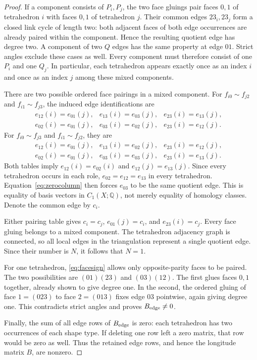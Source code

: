 \documentclass[11pt]{article}
\theoremstyle{definition}\newtheorem{definition}[theorem]{Definition}
\theoremstyle{remark}\newtheorem{remark}[theorem]{Remark}
\newcommand{\Q}{\mathbb Q}
\begin{document}
\begin{proof}
If a component consists of $P_i,P_j$, the two face gluings pair
faces $0,1$ of tetrahedron $i$ with faces $0,1$ of tetrahedron $j$.
Their common edges $23_i,23_j$ form a closed link cycle of length
two: both adjacent faces of both edge occurrences are already paired
within the component. Hence the resulting quotient edge has degree
two. A component of two $Q$ edges has the same property at edge
$01$. Strict angles exclude these cases as well. Every component
must therefore consist of one $P_i$ and one $Q_j$. In particular,
each tetrahedron appears exactly once as an index $i$ and once as
an index $j$ among these mixed components.

There are two possible ordered face pairings in a mixed component.
For $f_{i0}\sim f_{j2}$ and $f_{i1}\sim f_{j3}$, the induced edge
identifications are
\[
\begin{array}{lll}
e_{12}(i)=e_{01}(j),&e_{13}(i)=e_{03}(j),&e_{23}(i)=e_{13}(j),\\
e_{02}(i)=e_{01}(j),&e_{03}(i)=e_{02}(j),&e_{23}(i)=e_{12}(j).
\end{array}
\]
For $f_{i0}\sim f_{j3}$ and $f_{i1}\sim f_{j2}$, they are
\[
\begin{array}{lll}
e_{12}(i)=e_{01}(j),&e_{13}(i)=e_{02}(j),&e_{23}(i)=e_{12}(j),\\
e_{02}(i)=e_{01}(j),&e_{03}(i)=e_{03}(j),&e_{23}(i)=e_{13}(j).
\end{array}
\]
Both tables imply $e_{12}(i)=e_{02}(i)$ and
$e_{12}(j)=e_{13}(j)$. Since every tetrahedron occurs in each role,
$e_{02}=e_{12}=e_{13}$ in every tetrahedron. Equation~\eqref{eq:zerocolumn}
then forces $e_{03}$ to be the same quotient edge. This is equality
of basis vectors in $C_1(X;\Q)$, not merely equality of homology
classes. Denote the common edge by $c_i$.

Either pairing table gives $c_i=c_j$, $e_{01}(j)=c_i$, and
$e_{23}(i)=c_j$. Every face gluing belongs to a mixed component.
The tetrahedron adjacency graph is connected, so all local edges in
the triangulation represent a single quotient edge. Since their
number is $N$, it follows that $N=1$.

For one tetrahedron, \eqref{eq:facesign} allows only opposite-parity
faces to be paired. The two possibilities are $(01)(23)$ and
$(03)(12)$. The first glues faces $0,1$ together, already shown to
give degree one. In the second, the ordered gluing of face
$1=(023)$ to face $2=(013)$ fixes edge $03$ pointwise, again giving
degree one. This contradicts strict angles and proves
$B_{\rm edge}\ne0$.

Finally, the sum of all edge rows of $B_{\rm edge}$ is zero: each
tetrahedron has two occurrences of each shape type. If deleting one
row left a zero matrix, that row would be zero as well. Thus the
retained edge rows, and hence the longitude matrix $B$, are nonzero.
\end{proof}
\end{document}
